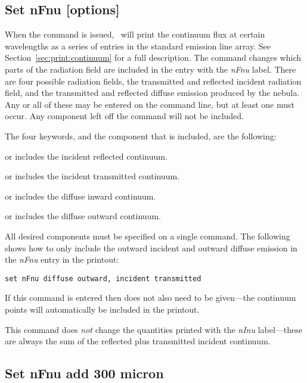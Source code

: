\subsection{Set nFnu [options]}
\label{sec:set:nfnu}

When the  command is issued, \Cloudy\ will print
the continuum flux at certain wavelengths as a series of entries in the
standard emission line array. See Section~\ref{sec:print:continuum} for a
full description. 
The  command changes which parts of the
radiation field  are included in the entry
with the \emph{nFnu} label.
There are four possible radiation fields, the transmitted
and reflected incident radiation field,
and the transmitted and reflected diffuse
emission produced by the nebula.
Any or all of these may be entered on the command line, but at least one must occur.
Any
component left off the command will not be included.

The four keywords, and the component that is included, are the following:

  or  includes
the incident reflected continuum.

  or  includes
the incident transmitted continuum.

  or  includes the diffuse
inward continuum.

  or  includes the
diffuse outward continuum.

All desired components must be specified on a single  command.
The following
shows how to only include the outward incident and outward diffuse emission
in the \emph{nFnu} entry in the printout:
\begin{verbatim}
set nFnu diffuse outward, incident transmitted
\end{verbatim}

If this command is entered then 
does not also need to
be given---the continuum points will automatically be included in the printout.

This command
does {\em not} change the quantities printed with the \emph{nInu} label---these
are always the sum of the reflected plus transmitted incident continuum.

\subsection{Set nFnu add 300 micron}
\label{sec:set:nfnu:add}


